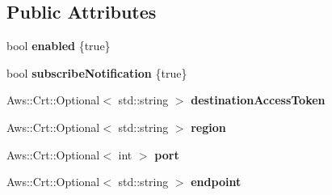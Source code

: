 \subsection*{Public Attributes}
\begin{DoxyCompactItemize}
\item 
\mbox{\label{struct_aws_1_1_iot_1_1_device_client_1_1_plain_config_1_1_tunneling_a6a6d6e957f99f27309f6fc1e51590bf0}} 
bool {\bfseries enabled} \{true\}
\item 
\mbox{\label{struct_aws_1_1_iot_1_1_device_client_1_1_plain_config_1_1_tunneling_a100273d25fa8b1664367785219f3dbfb}} 
bool {\bfseries subscribe\+Notification} \{true\}
\item 
\mbox{\label{struct_aws_1_1_iot_1_1_device_client_1_1_plain_config_1_1_tunneling_a29ab11ae97d402a20660154ba24e8b02}} 
Aws\+::\+Crt\+::\+Optional$<$ std\+::string $>$ {\bfseries destination\+Access\+Token}
\item 
\mbox{\label{struct_aws_1_1_iot_1_1_device_client_1_1_plain_config_1_1_tunneling_a32c9bd2a50d6d2a094e60af9e5a23a53}} 
Aws\+::\+Crt\+::\+Optional$<$ std\+::string $>$ {\bfseries region}
\item 
\mbox{\label{struct_aws_1_1_iot_1_1_device_client_1_1_plain_config_1_1_tunneling_a2a609db9df83baed8909716cc5513bff}} 
Aws\+::\+Crt\+::\+Optional$<$ int $>$ {\bfseries port}
\item 
\mbox{\label{struct_aws_1_1_iot_1_1_device_client_1_1_plain_config_1_1_tunneling_a2d2ca5c60e3afcb6bf89a4433f64bf16}} 
Aws\+::\+Crt\+::\+Optional$<$ std\+::string $>$ {\bfseries endpoint}
\end{DoxyCompactItemize}
